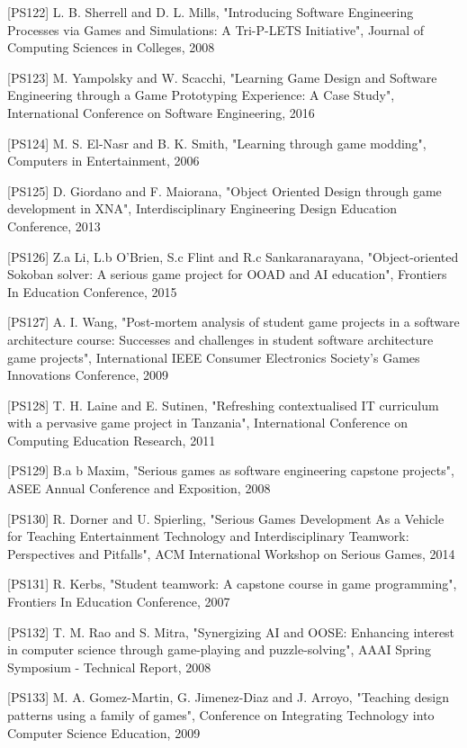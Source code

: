 [PS122]	L. B. Sherrell and D. L. Mills, "Introducing Software Engineering Processes via Games and Simulations: A Tri-P-LETS Initiative", Journal of Computing Sciences in Colleges, 2008

[PS123]	M. Yampolsky and W. Scacchi, "Learning Game Design and Software Engineering through a Game Prototyping Experience: A Case Study", International Conference on Software Engineering, 2016

[PS124]	M. S. El-Nasr and B. K. Smith, "Learning through game modding", Computers in Entertainment, 2006

[PS125]	D. Giordano and F. Maiorana, "Object Oriented Design through game development in XNA", Interdisciplinary Engineering Design Education Conference, 2013

[PS126]	Z.a Li, L.b O'Brien, S.c Flint and R.c Sankaranarayana, "Object-oriented Sokoban solver: A serious game project for OOAD and AI education", Frontiers In Education Conference, 2015

[PS127]	A. I. Wang, "Post-mortem analysis of student game projects in a software architecture course: Successes and challenges in student software architecture game projects", International IEEE Consumer Electronics Society's Games Innovations Conference, 2009

[PS128]	T. H. Laine and E. Sutinen, "Refreshing contextualised IT curriculum with a pervasive game project in Tanzania", International Conference on Computing Education Research, 2011

[PS129]	B.a b Maxim, "Serious games as software engineering capstone projects", ASEE Annual Conference and Exposition, 2008

[PS130]	R. Dorner and U. Spierling, "Serious Games Development As a Vehicle for Teaching Entertainment Technology and Interdisciplinary Teamwork: Perspectives and Pitfalls", ACM International Workshop on Serious Games, 2014

[PS131]	R. Kerbs, "Student teamwork: A capstone course in game programming", Frontiers In Education Conference, 2007

[PS132]	T. M. Rao and S. Mitra, "Synergizing AI and OOSE: Enhancing interest in computer science through game-playing and puzzle-solving", AAAI Spring Symposium - Technical Report, 2008

[PS133]	M. A. Gomez-Martin, G. Jimenez-Diaz and J. Arroyo, "Teaching design patterns using a family of games", Conference on Integrating Technology into Computer Science Education, 2009

